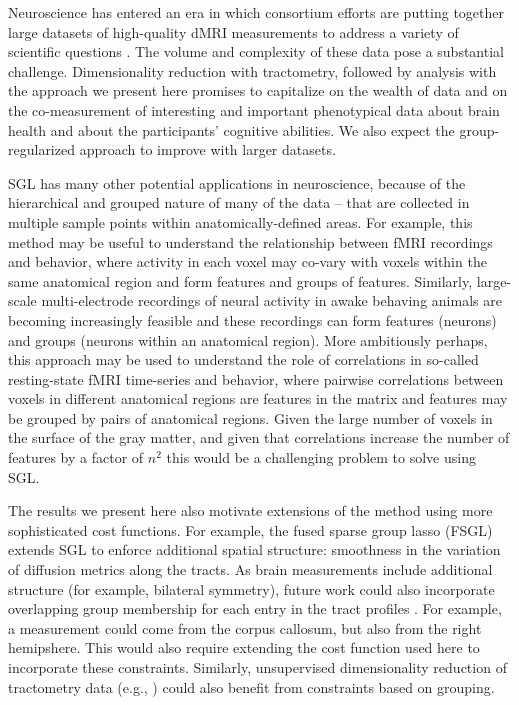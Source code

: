 Neuroscience has entered an era in which consortium efforts are putting together
large datasets of high-quality dMRI measurements to address a variety of
scientific questions \cite{jernigan2016ping, jernigan2018abcd,
alexander2017open, Miller2016-hw, VanEssen2012}. The volume and complexity of
these data pose a substantial challenge. Dimensionality reduction with
tractometry, followed by analysis with the approach we present here promises to
capitalize on the wealth of data and on the co-measurement of interesting and
important phenotypical data about brain health and about the participants'
cognitive abilities. We also expect the group-regularized approach to improve
with larger datasets.

SGL has many other potential applications in neuroscience, because of the
hierarchical and grouped nature of many of the data -- that are collected in
multiple sample points within anatomically-defined areas. For example, this
method may be useful to understand the relationship between fMRI recordings and
behavior, where activity in each voxel may co-vary with voxels within the same
anatomical region and form features and groups of features. Similarly,
large-scale multi-electrode recordings of neural activity in awake behaving
animals are becoming increasingly feasible \cite{steinmetz2018distributed,
Jun2017-gv} and these recordings can form features (neurons) and groups (neurons
within an anatomical region). More ambitiously perhaps, this approach may be
used to understand the role of correlations in so-called resting-state fMRI
time-series and behavior, where pairwise correlations between voxels in
different anatomical regions are features in the matrix and features may be
grouped by pairs of anatomical regions. Given the large number of voxels in the
surface of the gray matter, and given that correlations increase the number of
features by a factor of $n^2$ this would be a challenging problem to solve using
SGL.

The results we present here also motivate extensions of the method using more
sophisticated cost functions. For example, the fused sparse group lasso (FSGL)
\cite{zhou2012} extends SGL to enforce additional spatial structure: smoothness
in the variation of diffusion metrics along the tracts. As brain measurements
include additional structure (for example, bilateral symmetry), future work
could also incorporate overlapping group membership for each entry in the tract
profiles \cite{Rao2014-xm}. For example, a measurement could come from the
corpus callosum, but also from the right hemipshere. This would also require
extending the cost function used here to incorporate these constraints.
Similarly, unsupervised dimensionality reduction of tractometry data (e.g.,
\cite{Chamberland2019-mu}) could also benefit from constraints based on
grouping.

